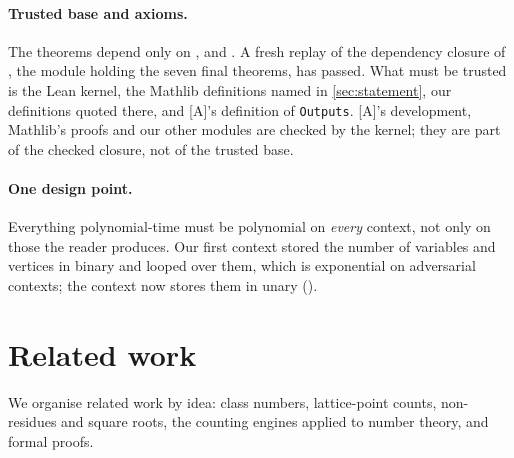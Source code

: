 \documentclass[10pt]{amsart}
\theoremstyle{plain}
\theoremstyle{definition}
\theoremstyle{remark}
\numberwithin{equation}{section}
\newcommand{\A}{\textup{[A]}}
\begin{document}
\paragraph{Trusted base and axioms.} The theorems depend only on , 
and .
A fresh  replay of the dependency closure of , the module
holding the seven final theorems, has passed.
What must be trusted is the Lean kernel, the Mathlib definitions named in \cref{sec:statement}, our
definitions quoted there, and \A's definition of \texttt{Outputs}. \A's development, Mathlib's proofs and
our other modules are checked by the kernel; they are part of the checked closure, not of the trusted base.

\paragraph{One design point.} Everything polynomial-time must be polynomial on \emph{every} context, not
only on those the reader produces. Our first context stored the number of variables and vertices in binary
and looped over them, which is exponential on adversarial contexts; the context now stores them in unary
().

\section{Related work}\label{sec:related}

We organise related work by idea: class numbers, lattice-point counts, non-residues and square roots,
the counting engines applied to number theory, and formal proofs.
\end{document}

